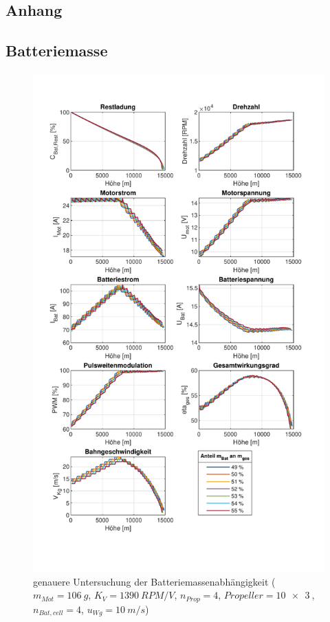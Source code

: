 \begin{appendix}
\chapter{Anhang}
\label{chap:anhang}

\section{Batteriemasse}
\begin{figure}[H]
\centering
	\includegraphics[scale=0.85]{Diagramme/Batteriemasse_genauer.pdf}
	\caption{genauere Untersuchung der Batteriemassenabhängigkeit (\ensuremath{m_{Mot}=\SI{106}{g}}, \ensuremath{K_V=\SI{1390}{RPM/V}}, \ensuremath{n_{Prop}=4}, \ensuremath{Propeller=\SI{10x3}{}}, \ensuremath{n_{Bat,cell}=4}, \ensuremath{u_{Wg}=\SI{10}{m/s}})}
	\label{abb:batteriemasse_genauer}
\end{figure}


\end{appendix}
